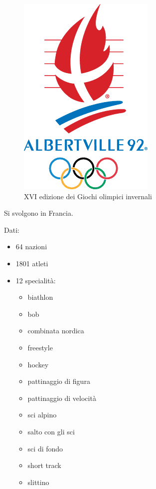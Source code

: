\documentclass[
]{book}
\providecommand{\tightlist}{%
  \setlength{\itemsep}{0pt}\setlength{\parskip}{0pt}}
\begin{document}
\begin{figure}
\includegraphics[width=0.4\linewidth]{images/loghi/1992} \caption{XVI edizione dei Giochi olimpici invernali}\label{fig:unnamed-chunk-52}
\end{figure}

Si svolgono in Francia.

Dati:

\begin{itemize}
\tightlist
\item
  64 nazioni
\item
  1801 atleti
\item
  12 specialità:

  \begin{itemize}
  \tightlist
  \item
    biathlon
  \item
    bob
  \item
    combinata nordica
  \item
    freestyle
  \item
    hockey
  \item
    pattinaggio di figura
  \item
    pattinaggio di velocità
  \item
    sci alpino
  \item
    salto con gli sci
  \item
    sci di fondo
  \item
    short track
  \item
    slittino
  \end{itemize}
\end{itemize}
\end{document}
